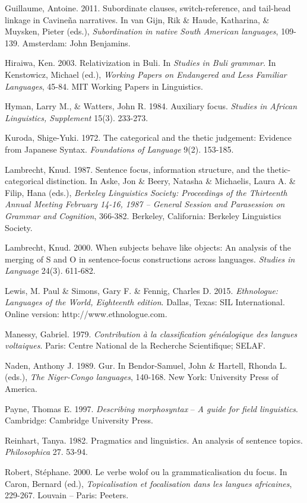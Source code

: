 \documentclass[output=paper]{langsci/langscibook}
\begin{document}
Guillaume, Antoine. 2011. Subordinate clauses, switch-reference, and tail-head linkage in Cavineña narratives. In van Gijn, Rik \& Haude, Katharina, \& Muysken, Pieter (eds.), \textit{Subordination in native South American languages}, 109-139. Amsterdam: John Benjamins.

Hiraiwa, Ken. 2003. Relativization in Buli. In \textit{Studies in Buli grammar. }In Kenstowicz, Michael (ed.), \textit{Working Papers on Endangered and Less Familiar Languages}, 45-84. MIT Working Papers in Linguistics.

Hyman, Larry M., \& Watters, John R. 1984. Auxiliary focus. \textit{Studies in African Linguistics, Supplement} 15(3). 233-273.

Kuroda, Shige-Yuki. 1972. The categorical and the thetic judgement: Evidence from Japanese Syntax. \textit{Foundations of Language} 9(2). 153-185.

Lambrecht, Knud. 1987. Sentence focus, information structure, and the thetic-categorical distinction. In Aske, Jon \& Beery, Natasha \& Michaelis, Laura A. \& Filip, Hana (eds.), \textit{Berkeley Linguistics Society: Proceedings of the Thirteenth Annual Meeting February 14-16, 1987 – General Session and Parasession on Grammar and Cognition}, 366-382. Berkeley, California: Berkeley Linguistics Society.

Lambrecht, Knud. 2000. When subjects behave like objects: An analysis of the merging of S and O in sentence-focus constructions across languages. \textit{Studies in Language} 24(3). 611-682.

Lewis, M. Paul \& Simons, Gary F. \& Fennig, Charles D. 2015. \textit{Ethnologue: Languages of the World, Eighteenth edition}. Dallas, Texas: SIL International. Online version: http://www.ethnologue.com.

Manessy, Gabriel. 1979. \textit{Contribution à la classification généalogique des langues voltaiques}. Paris: Centre National de la Recherche Scientifique; SELAF.

Naden, Anthony J. 1989. Gur. In Bendor-Samuel, John \& Hartell, Rhonda L. (eds.), \textit{The Niger-Congo languages}, 140-168. New York: University Press of America.

Payne, Thomas E. 1997. \textit{Describing morphosyntax }–\textit{ A guide for field linguistics}. Cambridge: Cambridge University Press.

Reinhart, Tanya. 1982. Pragmatics and linguistics. An analysis of sentence topics. \textit{Philosophica} 27. 53-94.

Robert, Stéphane. 2000. Le verbe wolof ou la grammaticalisation du focus. In Caron, Bernard (ed.), \textit{Topicalisation et focalisation dans les langues africaines}, 229-267. Louvain – Paris: Peeters.
\end{document}
